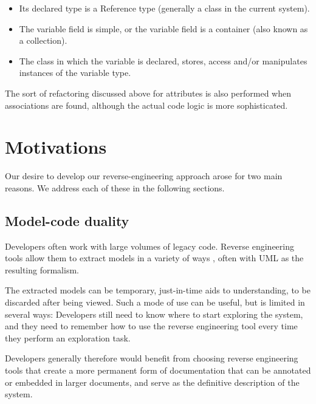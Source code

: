 \begin{itemize}
\item Its declared type is a Reference type (generally a class in the current system).
\item The variable field is simple, or the variable field is a container (also known as a collection).
\item The class in which the variable is declared, stores, access and/or manipulates instances of the variable type.


\end{itemize}

The sort of refactoring discussed above for attributes is also performed when associations are found, although the actual code logic is more sophisticated.


\section{Motivations}

Our desire to develop our reverse-engineering approach arose for two main reasons. We address each of these in the following sections.

\subsection{Model-code duality}

Developers often work with large volumes of legacy code. Reverse engineering tools allow them to extract models in a variety of ways \cite{OsmanChaudron}, often with UML as the resulting formalism.

The extracted models can be temporary, just-in-time aids to understanding, to be discarded after being viewed. Such a mode of use can be useful, but is limited in several ways: Developers still need to know where to start exploring the system, and they need to remember how to use the reverse engineering tool every time they perform an exploration task. 

Developers generally therefore would benefit from choosing reverse engineering tools that create a more permanent form of documentation that can be annotated or embedded in larger documents, and serve as the definitive description of the system. 

